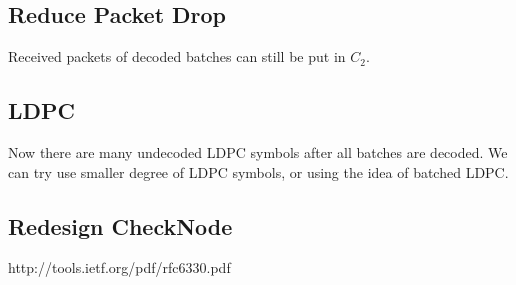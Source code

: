 \documentclass{report}
\begin{document}
\subsection{Reduce Packet Drop}

Received packets of decoded batches can still be put in $C_2$.

\subsection{LDPC}

Now there are many undecoded LDPC symbols after all batches are
decoded. We can try use smaller degree of LDPC symbols, or using the
idea of batched LDPC.

\subsection{Redesign CheckNode}


\begin{thebibliography}{99}
  http://tools.ietf.org/pdf/rfc6330.pdf
\end{thebibliography}
\end{document}
